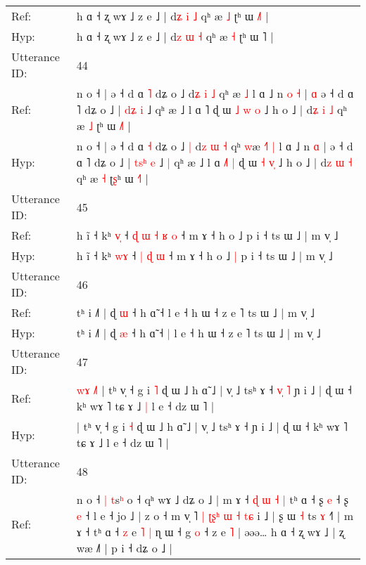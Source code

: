 \documentclass[10pt]{article}
\DeclareRobustCommand{\hl}[1]{{\textcolor{red}{#1}}}
\begin{document}
\begin{longtable}{ll}
Ref: & h ɑ ˧ ʐ wɤ ˩ z e ˩ | d\hl{ʑ} \hl{i} \hl{˩} qʰ æ \hl{˩} ʈʰ ɯ \hl{˩}˥ |
 \\
Hyp: & h ɑ ˧ ʐ wɤ ˩ z e ˩ | d\hl{z} \hl{ɯ} \hl{˧} qʰ æ \hl{˧} ʈʰ ɯ \hl{}˥ |
 \\
\midrule
Utterance ID: & 44 \\
Ref: & n o ˧ | ə ˧ d ɑ \hl{˥} dʑ o ˩\hl{}\hl{} d\hl{ʑ} \hl{i} \hl{˩} qʰ \hl{}æ\hl{}\hl{}\hl{} \hl{˩} l ɑ ˩ n\hl{ }\hl{o} \hl{˧} |\hl{ }\hl{ɑ} ə ˧ d ɑ ˥ dʑ o ˩ | \hl{}\hl{d}\hl{ʑ} \hl{i} ˩\hl{}\hl{} qʰ æ ˩ l ɑ \hl{}˥\hl{}\hl{} ɖ ɯ \hl{˩} \hl{w}\hl{ }\hl{o} ˩ h o ˩ | d\hl{ʑ} \hl{i} \hl{˩} qʰ æ \hl{˩} ʈ\hl{}ʰ ɯ \hl{˩}˥ |
 \\
Hyp: & n o ˧ | ə ˧ d ɑ \hl{˧} dʑ o ˩\hl{ }\hl{|} d\hl{z} \hl{ɯ} \hl{˧} qʰ \hl{w}æ\hl{ }\hl{˧}\hl{˥} \hl{|} l ɑ ˩ n\hl{}\hl{} \hl{ɑ} |\hl{}\hl{} ə ˧ d ɑ ˥ dʑ o ˩ | \hl{t}\hl{s}\hl{ʰ} \hl{e} ˩\hl{ }\hl{|} qʰ æ ˩ l ɑ \hl{˩}˥\hl{ }\hl{|} ɖ ɯ \hl{˧} \hl{}\hl{v}\hl{̩} ˩ h o ˩ | d\hl{z} \hl{ɯ} \hl{˧} qʰ æ \hl{˧} ʈ\hl{ʂ}ʰ ɯ \hl{˧}˥ |
 \\
\midrule
Utterance ID: & 45 \\
Ref: & h ĩ ˧ kʰ \hl{v}\hl{̩} ˧\hl{ }\hl{ɖ}\hl{ }\hl{ɯ} \hl{˧} \hl{ʁ} \hl{o} ˧ m ɤ ˧ h o ˩\hl{}\hl{} p i ˧ ts ɯ ˩ | m v̩ ˩
 \\
Hyp: & h ĩ ˧ kʰ \hl{w}\hl{ɤ} ˧\hl{}\hl{}\hl{}\hl{} \hl{|} \hl{ɖ} \hl{ɯ} ˧ m ɤ ˧ h o ˩\hl{ }\hl{|} p i ˧ ts ɯ ˩ | m v̩ ˩
 \\
\midrule
Utterance ID: & 46 \\
Ref: & tʰ i ˩˥ | ɖ \hl{ɯ} ˧ h ɑ̃ ˧\hl{}\hl{} l e ˧ h ɯ ˧ z e ˥ ts ɯ ˩ | m v̩ ˩
 \\
Hyp: & tʰ i ˩˥ | ɖ \hl{æ} ˧ h ɑ̃ ˧\hl{ }\hl{|} l e ˧ h ɯ ˧ z e ˥ ts ɯ ˩ | m v̩ ˩
 \\
\midrule
Utterance ID: & 47 \\
Ref: & \hl{w}\hl{ɤ}\hl{ }\hl{˩}\hl{˥}\hl{ }| tʰ v̩ ˧ g i \hl{˥} ɖ ɯ ˩ h ɑ̃ ˩ | v̩ ˩ tsʰ ɤ ˧\hl{ }\hl{v}\hl{̩}\hl{ }\hl{˥} ɲ i ˩ | ɖ ɯ ˧ kʰ wɤ ˥ tɕ ɤ ˩\hl{ }\hl{|} l e ˧ dz ɯ ˥ |
 \\
Hyp: & \hl{}\hl{}\hl{}\hl{}\hl{}\hl{}| tʰ v̩ ˧ g i \hl{˧} ɖ ɯ ˩ h ɑ̃ ˩ | v̩ ˩ tsʰ ɤ ˧\hl{}\hl{}\hl{}\hl{}\hl{} ɲ i ˩ | ɖ ɯ ˧ kʰ wɤ ˥ tɕ ɤ ˩\hl{}\hl{} l e ˧ dz ɯ ˥ |
 \\
\midrule
Utterance ID: & 48 \\
Ref: & n o ˧\hl{ }\hl{|} \hl{t}s\hl{ʰ} o ˧ qʰ wɤ ˩ dʑ o ˩ | m ɤ ˧ \hl{ɖ} \hl{ɯ} \hl{˧} \hl{|} tʰ ɑ ˧ \hl{}ʂ\hl{} \hl{e} ˧ ʂ \hl{e} ˧\hl{}\hl{} l e ˧ jo ˩ | z o ˧ m v̩ ˥\hl{ }\hl{|} \hl{ʈ}\hl{ʂ}\hl{ʰ}\hl{ }\hl{ɯ} \hl{˧} \hl{t}\hl{ɕ} i ˩ | ʂ ɯ \hl{˧} ts \hl{ɤ} ˧˥ | m ɤ ˧ tʰ ɑ ˧ \hl{z} e\hl{ }\hl{˥} \hl{|} ɳ ɯ ˧ g \hl{}\hl{o} ˧ z e \hl{˥} | əəə… h ɑ ˧ ʐ wɤ ˩ | ʐ wæ ˩˥ | p i ˧ dʑ o ˩ |

\end{longtable}
\end{document}
